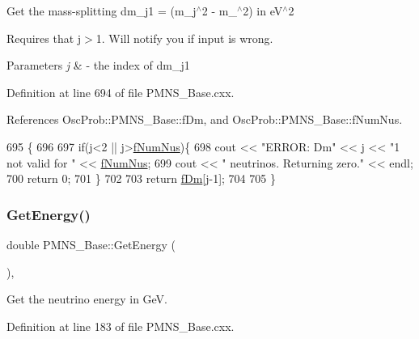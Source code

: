 Get the mass-\/splitting dm\+\_\+j1 = (m\+\_\+j$^\wedge$2 -\/ m\+\_$^\wedge$2) in e\+V$^\wedge$2

Requires that j$>$1. Will notify you if input is wrong.


\begin{DoxyParams}{Parameters}
{\em j} & -\/ the index of dm\+\_\+j1 \\
\hline
\end{DoxyParams}


Definition at line 694 of file P\+M\+N\+S\+\_\+\+Base.\+cxx.



References Osc\+Prob\+::\+P\+M\+N\+S\+\_\+\+Base\+::f\+Dm, and Osc\+Prob\+::\+P\+M\+N\+S\+\_\+\+Base\+::f\+Num\+Nus.


\begin{DoxyCode}
695 \{
696 
697   \textcolor{keywordflow}{if}(j<2 || j>\hyperlink{classOscProb_1_1PMNS__Base_a24bb74bed63569dfe88b18fa6a08060e}{fNumNus})\{
698     cout << \textcolor{stringliteral}{"ERROR: Dm"} << j << \textcolor{stringliteral}{"1 not valid for "} << \hyperlink{classOscProb_1_1PMNS__Base_a24bb74bed63569dfe88b18fa6a08060e}{fNumNus};
699     cout << \textcolor{stringliteral}{" neutrinos. Returning zero."} << endl;
700     \textcolor{keywordflow}{return} 0;
701   \}
702 
703   \textcolor{keywordflow}{return} \hyperlink{classOscProb_1_1PMNS__Base_a406a31c3b5d620e5a0cace5b411f9f70}{fDm}[j-1];
704 
705 \}
\end{DoxyCode}
\mbox{\label{classOscProb_1_1PMNS__Base_acc0d46cc4b8f911b40b807225003bbed}} 
\subsubsection{\texorpdfstring{Get\+Energy()}{GetEnergy()}}
{\footnotesize\ttfamily double P\+M\+N\+S\+\_\+\+Base\+::\+Get\+Energy (\begin{DoxyParamCaption}{ }\end{DoxyParamCaption})\hspace{0.3cm}{\ttfamily [virtual]}, {\ttfamily [inherited]}}

Get the neutrino energy in GeV. 

Definition at line 183 of file P\+M\+N\+S\+\_\+\+Base.\+cxx.



